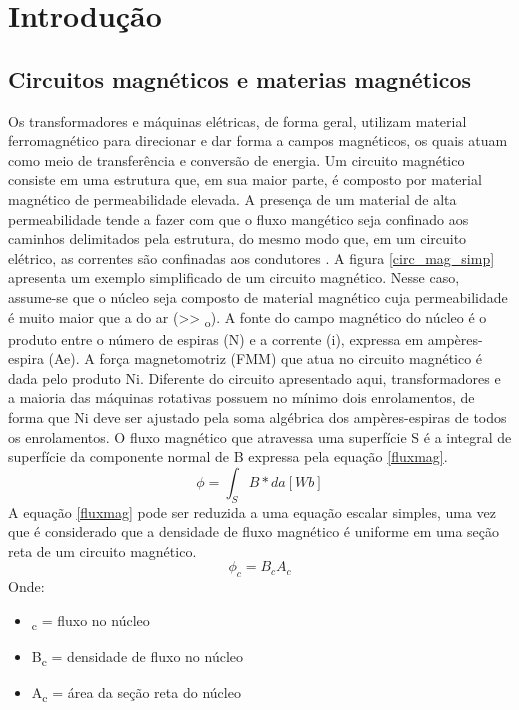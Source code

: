 \section{Introdução}
\label{cap:introducao}
\subsection{Circuitos magnéticos e materias magnéticos}
Os transformadores e máquinas elétricas, de forma geral, utilizam material ferromagnético para direcionar e dar forma a campos magnéticos, os quais atuam como meio de transferência e conversão de energia. Um circuito magnético consiste em uma estrutura que, em sua maior parte, é composto por material magnético de permeabilidade elevada. A presença de um material de alta permeabilidade tende a fazer com que o fluxo mangético seja confinado aos caminhos delimitados pela estrutura, do mesmo modo que, em um circuito elétrico, as correntes são confinadas aos condutores \cite{Fitzgerald2008}. A figura \ref{circ_mag_simp} apresenta um exemplo simplificado de um circuito magnético. Nesse caso, assume-se que o núcleo seja composto de material magnético cuja permeabilidade é muito maior que a do ar (\textmu >> \textmu\textsubscript{o}). A fonte do campo magnético do núcleo é o produto entre o número de espiras (N) e a corrente (i), expressa em ampères-espira (Ae). A força magnetomotriz (FMM) que atua no circuito magnético é dada pelo produto Ni. Diferente do circuito apresentado aqui, transformadores e a maioria das máquinas rotativas possuem no mínimo dois enrolamentos, de forma que Ni deve ser ajustado pela soma algébrica dos ampères-espiras de todos os enrolamentos. O fluxo magnético que atravessa uma superfície S é a integral de superfície da componente normal de B expressa pela equação \ref{fluxmag}.
\begin{equation}
\label{fluxmag}
\phi = \int_{S} B * da [Wb]
\end{equation}
A equação \ref{fluxmag} pode ser reduzida a uma equação escalar simples, uma vez que é considerado que a densidade de fluxo magnético é uniforme em uma seção reta de um circuito magnético.
\begin{equation}
\phi_{c} = B_{c} A_{c}
\end{equation}
Onde:
\begin{itemize}
\item \textphi\textsubscript{c} = fluxo no núcleo
\item B\textsubscript{c} = densidade de fluxo no núcleo
\item A\textsubscript{c} = área da seção reta do núcleo
\end{itemize}

